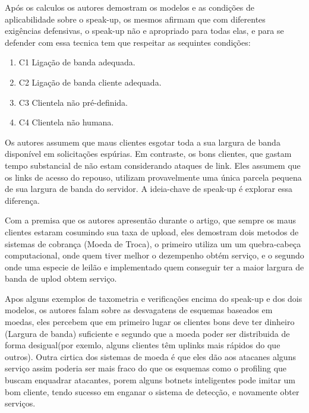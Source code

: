 \documentclass[a4paper,12pt]{article}
\begin{document}
Após os calculos os autores demostram os modelos e as condições de aplicabilidade sobre o speak-up, os mesmos afirmam que com diferentes exigências defensivas, o speak-up não e apropriado para todas elas, e para se defender com essa tecnica tem que respeitar as sequintes condições: 
\vspace{1cm}
\begin{enumerate}
	\item{C1} Ligação de banda adequada.

	\item{C2} Ligação de banda cliente adequada.

	\item{C3} Clientela não pré-definida.

	\item{C4} Clientela não humana.

\end{enumerate}
 
 \vspace{0.5cm}
 
 Os autores assumem que maus clientes esgotar toda a sua largura de banda disponível em
 solicitações espúrias. Em contraste, os bons clientes, que gastam tempo substancial de
 não estam considerando ataques de link. Eles assumem que os links de acesso do
 repouso, utilizam provavelmente uma única parcela pequena de sua largura de banda
 do servidor. A ideia-chave de speak-up é explorar essa diferença.
 \vspace{0.5cm}
 
 Com a premisa que os autores apresentão durante o artigo, que sempre os maus clientes estaram cosumindo sua taxa de upload, eles demostram dois metodos de sistemas de cobrança (Moeda de Troca), o primeiro utiliza um um quebra-cabeça computacional, onde quem tiver melhor o dezempenho obtém serviço, e o segundo onde uma especie de leilão e implementado quem conseguir ter a maior largura de banda de uplod obtem serviço. 
 
 \vspace{0.5cm}
 
 Apos alguns exemplos de taxometria e verificações encima do speak-up e dos dois modelos, os autores falam sobre as desvagatens de esquemas baseados em moedas, eles percebem que em primeiro lugar os clientes bons deve ter dinheiro (Largura de banda) suficiente e segundo que a moeda poder ser distribuida de forma desigual(por exemlo, alguns clientes têm uplinks mais rápidos do que outros). Outra cirtica dos sistemas de moeda é que eles dão aos atacanes alguns serviço assim poderia ser mais fraco do que os esquemas como o profiling que buscam enquadrar atacantes, porem alguns botnets inteligentes pode imitar um bom cliente, tendo sucesso em enganar o sistema de detecção, e novamente obter serviços.
 
\end{document}
